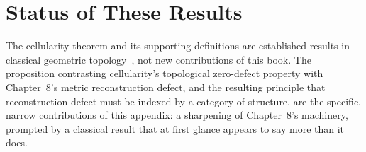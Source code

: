 \documentclass[11pt,fleqn]{book}
\numberwithin{equation}{chapter}
\theoremstyle{plain}
\theoremstyle{definition}
\theoremstyle{remark}
\begin{document}
\section{Status of These Results}

The cellularity theorem and its supporting definitions are established results in classical geometric topology~\cite{davermanvenema2009}, not new contributions of this book. The proposition contrasting cellularity's topological zero-defect property with Chapter~8's metric reconstruction defect, and the resulting principle that reconstruction defect must be indexed by a category of structure, are the specific, narrow contributions of this appendix: a sharpening of Chapter~8's machinery, prompted by a classical result that at first glance appears to say more than it does.


\backmatter

\end{document}
